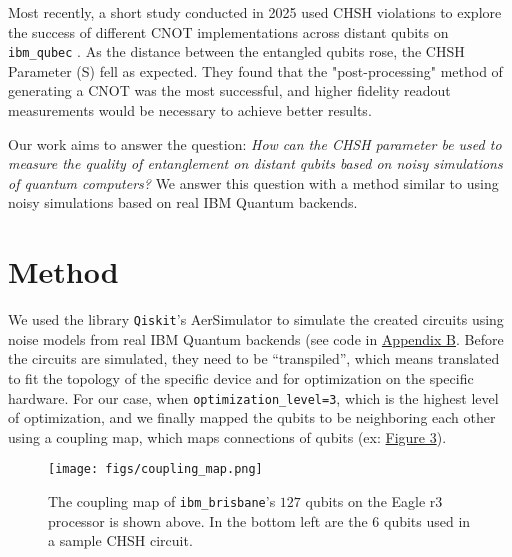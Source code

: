 \documentclass[a4paper, onecolumn, 11pt, titlepage]{quantumarticle}
\begin{document}
Most recently, a short study conducted in 2025 used CHSH violations to explore the success of different CNOT implementations across distant qubits on \verb|ibm_qubec| \cite{waring2025chshviolationsusingdynamic}. As the distance between the entangled qubits rose, the CHSH Parameter (S) fell as expected. They found that the "post-processing" method of generating a CNOT was the most successful, and higher fidelity readout measurements would be necessary to achieve better results.

Our work aims to answer the question: \textit{How can the CHSH parameter be used to measure the quality of entanglement on distant qubits based on noisy simulations of quantum computers?} We answer this question with a method similar to \cite{waring2025chshviolationsusingdynamic} using noisy simulations based on real IBM Quantum backends.

\section{Method}

We used the library \verb|Qiskit|’s AerSimulator \cite{qiskit2024} to simulate the created circuits using noise models from real IBM Quantum backends (see code in \hyperref[secondappendix]{Appendix B}. Before the circuits are simulated, they need to be “transpiled”, which means translated to fit the topology of the specific device and for optimization on the specific hardware. For our case, when \verb|optimization_level=3|, which is the highest level of optimization, and we finally mapped the qubits to be neighboring each other using a coupling map, which maps connections of qubits (ex: \hyperref[fig:coupling-map]{Figure 3}). 

\begin{figure}
    \centering
    \texttt{[image: figs/coupling\_map.png]}
    \caption{The coupling map of \texttt{ibm\_brisbane}'s  $127$ qubits on the Eagle r3 processor is shown above. In the bottom left are the $6$ qubits used in a sample CHSH circuit.}
    \label{fig:coupling-map}
\end{figure}
\end{document}
